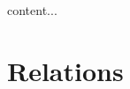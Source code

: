 \documentclass{book}
\begin{document}
	\begin{ex}
		content...
	\end{ex}
	
	\begin{ex}
		
	\end{ex}
	
	
	
	
	
	
	
	
	
	
	
	
	
	
	
	
	
	
	
	
	
	
	
	
	
	
	
	
	
	
	
	
	
	
	
	
	
	
	
	
	
	
	
	
	
	
	
	
	
	
	
	
	
	
	
	
	\newpage
	\section{Relations}
	
	
	
	
	
	
	
	
	
	
	
	
	
	
	
	
	
	
	
	
	
	
	
	
	
	
	
	
	
	
	
	
	
	
	
	
	
	
\end{document}
